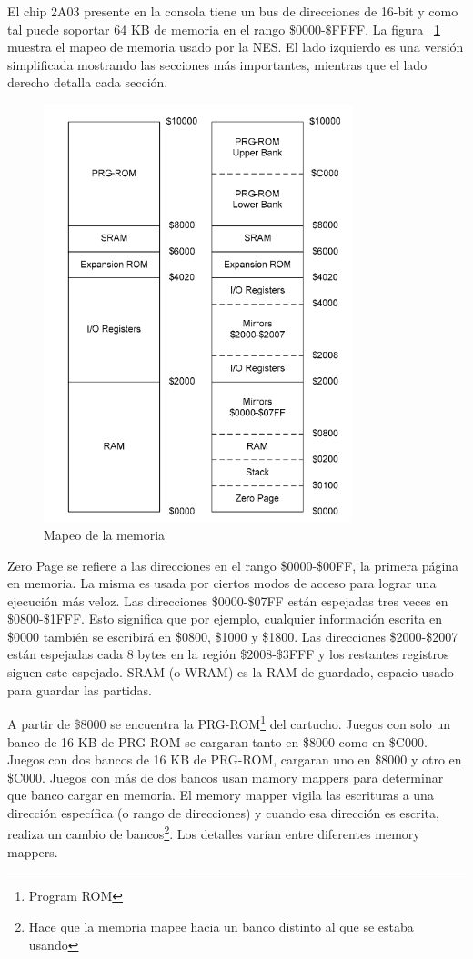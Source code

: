 El chip 2A03 presente en la consola tiene un bus de direcciones de 16-bit y como tal puede soportar 64 KB de memoria en el rango \$0000-\$FFFF. La figura ~\ref{fig:memorymap} muestra el mapeo de memoria usado por la NES. El lado izquierdo es una versión simplificada mostrando las secciones más importantes, mientras que el lado derecho detalla cada sección.
\begin{figure}[H]\caption{Mapeo de la memoria\label{fig:memorymap}}
\includegraphics[width=0.8\textwidth]{memorymap.png}
\end{figure}


Zero Page se refiere a las direcciones en el rango \$0000-\$00FF, la primera página en memoria. La misma es usada por ciertos modos de acceso para lograr una ejecución más veloz. Las direcciones  \$0000-\$07FF están espejadas tres veces en \$0800-\$1FFF. Esto significa que por ejemplo, cualquier información escrita en \$0000 también se escribirá en \$0800, \$1000 y \$1800. Las direcciones \$2000-\$2007 están espejadas cada 8 bytes en la región \$2008-\$3FFF y los restantes registros siguen este espejado. SRAM (o WRAM) es la RAM de guardado, espacio usado para guardar las partidas.

A partir de \$8000 se encuentra la PRG-ROM\footnote{Program ROM} del cartucho. Juegos con solo un banco de 16 KB de PRG-ROM se cargaran tanto en \$8000 como en \$C000. Juegos con dos bancos de 16 KB de PRG-ROM, cargaran uno en \$8000 y otro en \$C000. Juegos con más de dos bancos usan mamory mappers para determinar que banco cargar en memoria. El memory mapper vigila las escrituras a una dirección específica (o rango de direcciones) y cuando esa dirección es escrita, realiza un cambio de bancos\footnote{Hace que la memoria mapee hacia un banco distinto al que se estaba usando}. Los detalles varían entre diferentes memory mappers. 

